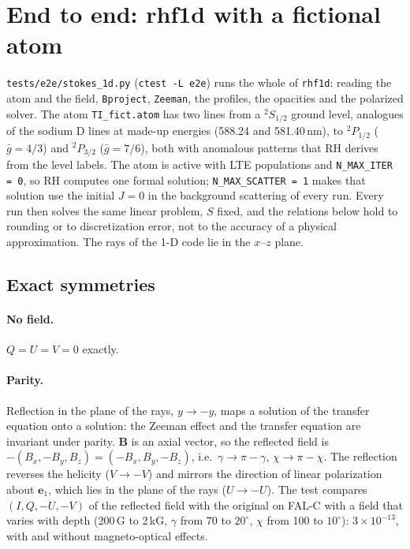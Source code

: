 \documentclass[11pt,a4paper]{article}
\newcommand{\code}[1]{\texttt{#1}}
\begin{document}
\section{End to end: rhf1d with a fictional atom}\label{sec:e2e}
\code{tests/e2e/stokes\_1d.py} (\code{ctest -L e2e}) runs the whole of
\code{rhf1d}: reading the atom and the field, \code{Bproject},
\code{Zeeman}, the profiles, the opacities and the polarized solver. The
atom \code{TI\_fict.atom} has two lines from a $^2S_{1/2}$ ground level,
analogues of the sodium D lines at made-up energies (588.24 and
581.40\,nm), to $^2P_{1/2}$ ($\bar g = 4/3$) and $^2P_{3/2}$
($\bar g = 7/6$), both with anomalous patterns that RH derives from the
level labels. The atom is active with LTE populations and
\code{N\_MAX\_ITER = 0}, so RH computes one formal solution;
\code{N\_MAX\_SCATTER = 1} makes that solution use the initial $J=0$ in
the background scattering of every run. Every run then solves the same
linear problem, $S$ fixed, and the relations below hold to rounding or to
discretization error, not to the accuracy of a physical approximation.
The rays of the 1-D code lie in the $x$--$z$ plane.

\subsection{Exact symmetries}
\paragraph{No field.} $Q=U=V=0$ exactly.

\paragraph{Parity.} Reflection in the plane of the rays, $y\to-y$, maps
a solution of the transfer equation onto a solution: the Zeeman effect
and the transfer equation are invariant under parity. $\boldsymbol B$ is
an axial vector, so the reflected field is
$-(B_x,-B_y,B_z) = (-B_x,B_y,-B_z)$, i.e.\ $\gamma\to\pi-\gamma$,
$\chi\to\pi-\chi$. The reflection reverses the helicity ($V\to-V$) and
mirrors the direction of linear polarization about $\boldsymbol e_1$,
which lies in the plane of the rays ($U\to-U$). The test compares
$(I,Q,-U,-V)$ of the reflected field with the original on FAL-C with a
field that varies with depth (200\,G to 2\,kG, $\gamma$ from 70 to
$20^\circ$, $\chi$ from 100 to $10^\circ$): $3\times10^{-13}$, with and
without magneto-optical effects.
\end{document}
